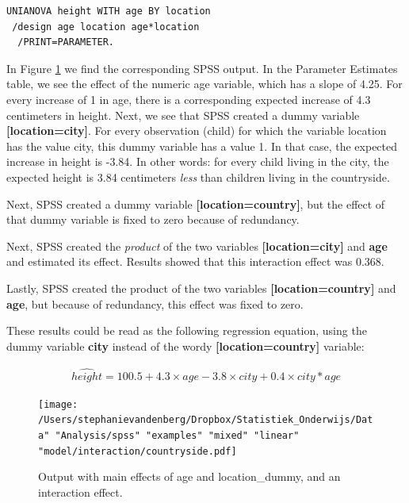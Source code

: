 \documentclass[]{book}\usepackage[]{graphicx}\usepackage[]{color}
\begin{document}
\begin{verbatim}
UNIANOVA height WITH age BY location
 /design age location age*location
  /PRINT=PARAMETER.
\end{verbatim}


In Figure \ref{fig:interactionheight} we find the corresponding SPSS output. In the Parameter Estimates table, we see the effect of the numeric age variable, which has a slope of 4.25. For every increase of 1 in age, there is a corresponding expected increase of 4.3 centimeters in height. Next, we see that SPSS created a dummy variable \textbf{[location=city]}. For every observation (child) for which the variable location has the value city, this dummy variable has a value 1. In that case, the expected increase in height is -3.84. In other words: for every child living in the city, the expected height is 3.84 centimeters \textit{less} than children living in the countryside. 

Next, SPSS created a dummy variable \textbf{[location=country]}, but the effect of that dummy variable is fixed to zero because of redundancy.

Next, SPSS created the \textit{product} of the two variables \textbf{[{location=city}]} and \textbf{age} and estimated its effect. Results showed that this interaction effect was 0.368.  

Lastly, SPSS created the product of the two variables \textbf{[{location=country}]} and \textbf{age}, but because of redundancy, this effect was fixed to zero.

These results could be read as the following regression equation, using the dummy variable \textbf{city} instead of the wordy \textbf{[{location=country}]} variable:

\begin{eqnarray}
\widehat{height} = 100.5  + 4.3  \times age -3.8 \times city + 0.4 \times city*age 
\end{eqnarray}





\begin{figure}[h]
    \begin{center}
       \texttt{[image: /Users/stephanievandenberg/Dropbox/Statistiek\_Onderwijs/Data" "Analysis/spss" "examples" "mixed" "linear" "model/interaction/countryside.pdf]}
    \end{center}
    \caption{Output with main effects of age and location\_dummy, and an interaction effect.}
        \label{fig:interactionheight}
\end{figure}
\end{document}
